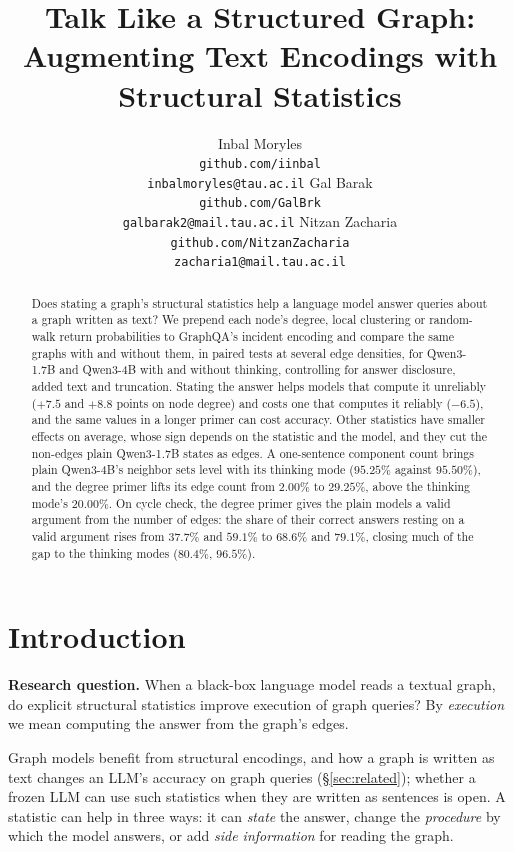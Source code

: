 \documentclass[11pt]{article}
\title{Talk Like a Structured Graph: Augmenting Text Encodings with Structural Statistics}
\author{
  Inbal Moryles\\
  \footnotesize\texttt{github.com/iinbal}\\
  \footnotesize\texttt{inbalmoryles@tau.ac.il}
  \And
  Gal Barak\\
  \footnotesize\texttt{github.com/GalBrk}\\
  \footnotesize\texttt{galbarak2@mail.tau.ac.il}
  \And
  Nitzan Zacharia\\
  \footnotesize\texttt{github.com/NitzanZacharia}\\
  \footnotesize\texttt{zacharia1@mail.tau.ac.il}
}
\date{}
\begin{document}
\raggedbottom
\maketitle
\begin{abstract}
Does stating a graph's structural statistics help a language model answer queries about a graph written as text? We prepend each node's degree, local clustering or random-walk return probabilities to GraphQA's incident encoding and compare the same graphs with and without them, in paired tests at several edge densities, for Qwen3-1.7B and Qwen3-4B with and without thinking, controlling for answer disclosure, added text and truncation. Stating the answer helps models that compute it unreliably ($+7.5$ and $+8.8$ points on node degree) and costs one that computes it reliably ($-6.5$), and the same values in a longer primer can cost accuracy. Other statistics have smaller effects on average, whose sign depends on the statistic and the model, and they cut the non-edges plain Qwen3-1.7B states as edges. A one-sentence component count brings plain Qwen3-4B's neighbor sets level with its thinking mode ($95.25\%$ against $95.50\%$), and the degree primer lifts its edge count from $2.00\%$ to $29.25\%$, above the thinking mode's $20.00\%$. On cycle check, the degree primer gives the plain models a valid argument from the number of edges: the share of their correct answers resting on a valid argument rises from $37.7\%$ and $59.1\%$ to $68.6\%$ and $79.1\%$, closing much of the gap to the thinking modes ($80.4\%$, $96.5\%$). %
\end{abstract}

\section{Introduction}
\label{sec:intro}
\textbf{Research question.} When a black-box language model reads a textual graph, do explicit structural statistics improve execution of graph queries? By \emph{execution} we mean computing the answer from the graph's edges.

Graph models benefit from structural encodings, and how a graph is written as text changes an LLM's accuracy on graph queries (\S\ref{sec:related}); whether a frozen LLM can use such statistics when they are written as sentences is open. A statistic can help in three ways: it can \emph{state} the answer, change the \emph{procedure} by which the model answers, or add \emph{side information} for reading the graph.
\end{document}
